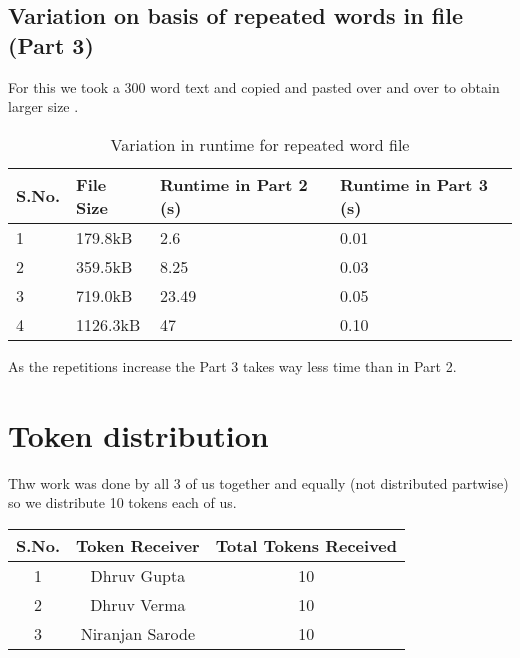 \documentclass{article}
\begin{document}
\subsection*{Variation on basis of repeated words in file (Part 3)}

For this we took a 300 word text and copied and pasted over and over to obtain larger size .

\begin{table}[h]
    \centering
    \begin{tabular}{|l|l|l|l|}
    \hline
    S.No. & File Size & Runtime in Part 2 (s) & Runtime in Part 3 (s) \\ \hline
    1     & 179.8kB   & 2.6                   & 0.01                  \\ \hline
    2     & 359.5kB   & 8.25                  & 0.03                  \\ \hline
    3     & 719.0kB   & 23.49                 & 0.05                  \\ \hline
    4     & 1126.3kB  & 47                    & 0.10                  \\ \hline
    \end{tabular}
    \caption{Variation in  runtime for repeated word file}
    \label{tab:my-table}
    \end{table}

As the repetitions increase the Part 3 takes way less time than in Part 2.
\section*{Token distribution}


Thw work was done by all 3 of us together and equally (not distributed partwise) so we distribute 10 tokens each of us.

    \begin{table}[h]
        \centering
        \begin{tabular}{|c|c|c|}
        \hline
        S.No. & Token Receiver  & Total Tokens Received \\ \hline
        1     & Dhruv Gupta     & 10                    \\ \hline
        2     & Dhruv Verma     & 10                    \\ \hline
        3     & Niranjan Sarode & 10                    \\ \hline
        \end{tabular}
        \end{table}
\end{document}
